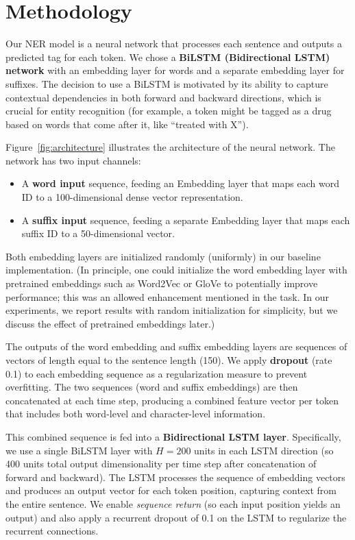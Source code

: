 \section{Methodology}
Our NER model is a neural network that processes each sentence and outputs a predicted tag for each token. We chose a \textbf{BiLSTM (Bidirectional LSTM) network} with an embedding layer for words and a separate embedding layer for suffixes. The decision to use a BiLSTM is motivated by its ability to capture contextual dependencies in both forward and backward directions, which is crucial for entity recognition (for example, a token might be tagged as a drug based on words that come after it, like ``treated with X'').

Figure~\ref{fig:architecture} illustrates the architecture of the neural network. The network has two input channels:
\begin{itemize}
    \item A \textbf{word input} sequence, feeding an Embedding layer that maps each word ID to a 100-dimensional dense vector representation.
    \item A \textbf{suffix input} sequence, feeding a separate Embedding layer that maps each suffix ID to a 50-dimensional vector.
\end{itemize}
Both embedding layers are initialized randomly (uniformly) in our baseline implementation. (In principle, one could initialize the word embedding layer with pretrained embeddings such as Word2Vec or GloVe to potentially improve performance; this was an allowed enhancement mentioned in the task. In our experiments, we report results with random initialization for simplicity, but we discuss the effect of pretrained embeddings later.)

The outputs of the word embedding and suffix embedding layers are sequences of vectors of length equal to the sentence length (150). We apply \textbf{dropout} (rate 0.1) to each embedding sequence as a regularization measure to prevent overfitting. The two sequences (word and suffix embeddings) are then concatenated at each time step, producing a combined feature vector per token that includes both word-level and character-level information.

This combined sequence is fed into a \textbf{Bidirectional LSTM layer}. Specifically, we use a single BiLSTM layer with $H=200$ units in each LSTM direction (so 400 units total output dimensionality per time step after concatenation of forward and backward). The LSTM processes the sequence of embedding vectors and produces an output vector for each token position, capturing context from the entire sentence. We enable \emph{sequence return} (so each input position yields an output) and also apply a recurrent dropout of 0.1 on the LSTM to regularize the recurrent connections.

